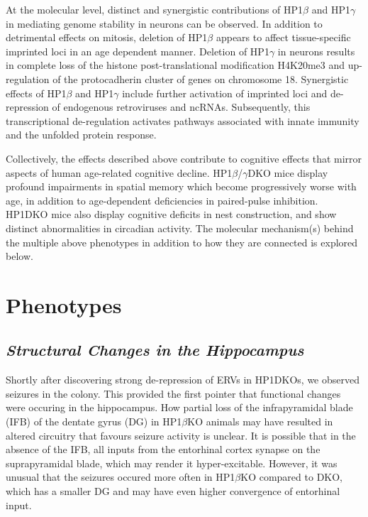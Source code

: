 \documentclass[onehalf,12pt]{beavtex}
\begin{document}
  At the molecular level, distinct and synergistic contributions of
  HP1\(\beta\) and HP1\(\gamma\) in mediating genome stability in neurons
  can be observed. In addition to detrimental effects on mitosis, deletion
  of HP1\(\beta\) appears to affect tissue-specific imprinted loci in an
  age dependent manner. Deletion of HP1\(\gamma\) in neurons results in
  complete loss of the histone post-translational modification H4K20me3
  and up-regulation of the protocadherin cluster of genes on chromosome
  18. Synergistic effects of HP1\(\beta\) and HP1\(\gamma\) include
  further activation of imprinted loci and de-repression of endogenous
  retroviruses and ncRNAs. Subsequently, this transcriptional
  de-regulation activates pathways associated with innate immunity and the
  unfolded protein response.
  
  Collectively, the effects described above contribute to cognitive
  effects that mirror aspects of human age-related cognitive decline.
  HP1\(\beta\)/\(\gamma\)DKO mice display profound impairments in spatial
  memory which become progressively worse with age, in addition to
  age-dependent deficiencies in paired-pulse inhibition. HP1DKO mice also
  display cognitive deficits in nest construction, and show distinct
  abnormalities in circadian activity. The molecular mechanism(s) behind
  the multiple above phenotypes in addition to how they are connected is
  explored below.
  
  \section{Phenotypes}\label{phenotypes}
  
  \subsection*{\texorpdfstring{\emph{Structural Changes in the
  Hippocampus}}{Structural Changes in the Hippocampus}}\label{structural-changes-in-the-hippocampus}
  
  Shortly after discovering strong de-repression of ERVs in HP1DKOs, we
  observed seizures in the colony. This provided the first pointer that
  functional changes were occuring in the hippocampus. How partial loss of
  the infrapyramidal blade (IFB) of the dentate gyrus (DG) in
  HP1\(\beta\)KO animals may have resulted in altered circuitry that
  favours seizure activity is unclear. It is possible that in the absence
  of the IFB, all inputs from the entorhinal cortex synapse on the
  suprapyramidal blade, which may render it hyper-excitable. However, it
  was unusual that the seizures occured more often in HP1\(\beta\)KO
  compared to DKO, which has a smaller DG and may have even higher
  convergence of entorhinal input.
  
\end{document}
